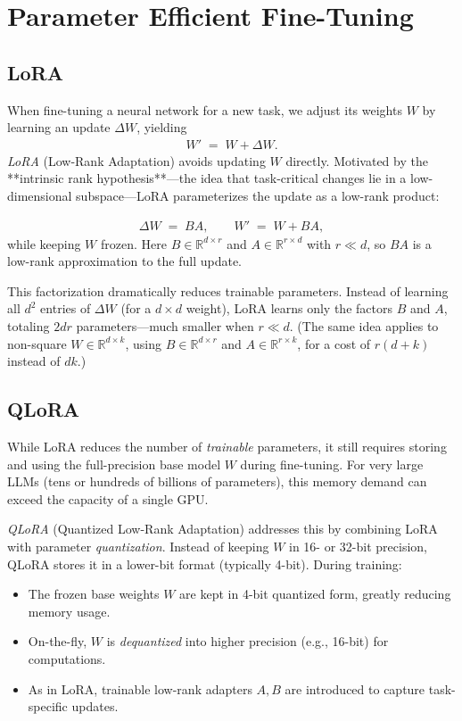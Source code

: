 \chapter{Parameter Efficient Fine-Tuning}

\section{LoRA}

When fine-tuning a neural network for a new task, we adjust its weights $W$ by learning an update $\Delta W$, yielding
\begin{align*}
	W' \;=\; W + \Delta W.
\end{align*}
\textit{LoRA} (Low-Rank Adaptation) avoids updating $W$ directly. Motivated by the **intrinsic rank hypothesis**—the idea that task-critical changes lie in a low-dimensional subspace—LoRA parameterizes the update as a low-rank product:

\begin{align*}
	\Delta W \;=\; B A,\qquad W' \;=\; W + BA,
\end{align*}
while keeping $W$ frozen. Here $B \in \mathbb{R}^{d\times r}$ and $A \in \mathbb{R}^{r\times d}$ with $r \ll d$, so $BA$ is a low-rank approximation to the full update.

This factorization dramatically reduces trainable parameters. Instead of learning all $d^2$ entries of $\Delta W$ (for a $d\times d$ weight), LoRA learns only the factors $B$ and $A$, totaling $2dr$ parameters—much smaller when $r \ll d$. (The same idea applies to non-square $W \in \mathbb{R}^{d\times k}$, using $B\in\mathbb{R}^{d\times r}$ and $A\in\mathbb{R}^{r\times k}$, for a cost of $r(d+k)$ instead of $dk$.)


\section{QLoRA}

While LoRA reduces the number of \emph{trainable} parameters, it still requires storing and using the full-precision base model $W$ during fine-tuning. For very large LLMs (tens or hundreds of billions of parameters), this memory demand can exceed the capacity of a single GPU.

\textit{QLoRA} (Quantized Low-Rank Adaptation) addresses this by combining LoRA with parameter \emph{quantization}. Instead of keeping $W$ in 16- or 32-bit precision, QLoRA stores it in a lower-bit format (typically 4-bit). During training:
\begin{itemize}
	\item The frozen base weights $W$ are kept in 4-bit quantized form, greatly reducing memory usage.
	\item On-the-fly, $W$ is \emph{dequantized} into higher precision (e.g., 16-bit) for computations.
	\item As in LoRA, trainable low-rank adapters $A, B$ are introduced to capture task-specific updates.
\end{itemize}

